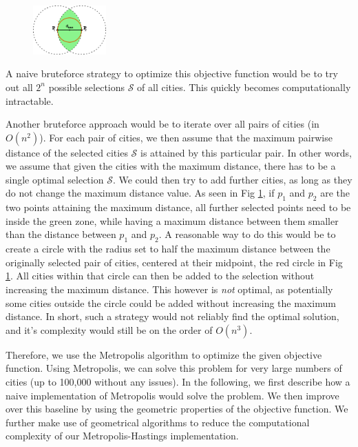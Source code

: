 \documentclass[conference,compsoc]{IEEEtran}
\newcommand{\selected}{\mathcal{S}}
\begin{document}
\begin{figure}
\vspace{-10pt}
\includegraphics[width=0.25\textwidth]{images/path899.png}
\vspace{-15pt}
\caption{}
\vspace{-15pt}
\label{fig:zones}
\end{figure}
A naive bruteforce strategy to optimize this objective function would be to try
out all $2^n$ possible selections $\selected$ of all cities. This quickly
becomes computationally intractable.



Another bruteforce approach would be to iterate over all pairs of cities (in
$O(n^2)$). For each pair of cities, we then assume that the maximum pairwise
distance of the selected cities $\selected$ is attained by this particular pair.
In other words, we assume that given the cities with the maximum distance, there
has to be a single optimal selection $\selected$. We could then try to add
further cities, as long as they do not change the maximum distance value. As
seen in Fig \ref{fig:zones}, if $p_1$ and $p_2$ are the two points attaining the
maximum distance, all further selected points need to be inside the green zone,
while having a maximum distance between them smaller than the distance between
$p_1$ and $p_2$. A reasonable way to do this would be to create a circle with
the radius set to half the maximum distance between the originally selected pair
of cities, centered at their midpoint, the red circle in Fig \ref{fig:zones}.
All cities within that circle can then be added to the selection without
increasing the maximum distance. This however is \emph{not} optimal, as
potentially some cities outside the circle could be added without increasing the
maximum distance. In short, such a strategy would not reliably find the optimal
solution, and it's complexity would still be on the order of $O(n^3)$.\

Therefore, we use the Metropolis algorithm \cite{metropolis53} to optimize the
given objective function. Using Metropolis, we can solve this problem for very
large numbers of cities (up to 100,000 without any issues). In the following, we
first describe how a naive implementation of Metropolis would solve the problem.
We then improve over this baseline by using the geometric properties of the
objective function. We further make use of geometrical algorithms to reduce the
computational complexity of our Metropolis-Hastings implementation.
\end{document}
